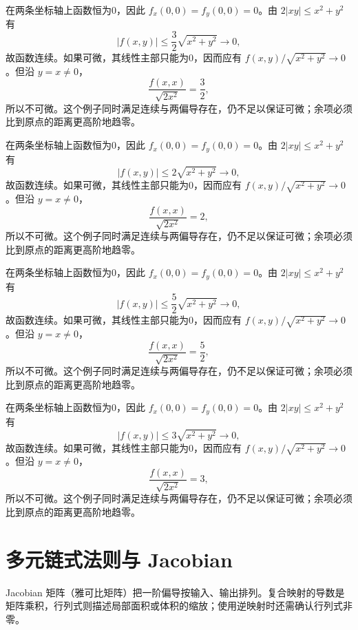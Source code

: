 \documentclass[UTF8,12pt,a4paper,fontset=fandol]{ctexart}
\begin{document}
\begin{solve}\label{ans:c32q22}
在两条坐标轴上函数恒为0，因此 $f_x(0,0)=f_y(0,0)=0$。由 $2|xy|\le x^2+y^2$ 有
\[
|f(x,y)|\le \frac{3}{2}\sqrt{x^2+y^2}\to0,
\]
故函数连续。如果可微，其线性主部只能为0，因而应有 $f(x,y)/\sqrt{x^2+y^2}\to0$。但沿 $y=x\ne0$，
\[
\frac{f(x,x)}{\sqrt{2x^2}}=\frac{3}{2},
\]
所以不可微。这个例子同时满足连续与两偏导存在，仍不足以保证可微；余项必须比到原点的距离更高阶地趋零。
\end{solve}

\begin{solve}\label{ans:c32q23}
在两条坐标轴上函数恒为0，因此 $f_x(0,0)=f_y(0,0)=0$。由 $2|xy|\le x^2+y^2$ 有
\[
|f(x,y)|\le 2\sqrt{x^2+y^2}\to0,
\]
故函数连续。如果可微，其线性主部只能为0，因而应有 $f(x,y)/\sqrt{x^2+y^2}\to0$。但沿 $y=x\ne0$，
\[
\frac{f(x,x)}{\sqrt{2x^2}}=2,
\]
所以不可微。这个例子同时满足连续与两偏导存在，仍不足以保证可微；余项必须比到原点的距离更高阶地趋零。
\end{solve}

\begin{solve}\label{ans:c32q24}
在两条坐标轴上函数恒为0，因此 $f_x(0,0)=f_y(0,0)=0$。由 $2|xy|\le x^2+y^2$ 有
\[
|f(x,y)|\le \frac{5}{2}\sqrt{x^2+y^2}\to0,
\]
故函数连续。如果可微，其线性主部只能为0，因而应有 $f(x,y)/\sqrt{x^2+y^2}\to0$。但沿 $y=x\ne0$，
\[
\frac{f(x,x)}{\sqrt{2x^2}}=\frac{5}{2},
\]
所以不可微。这个例子同时满足连续与两偏导存在，仍不足以保证可微；余项必须比到原点的距离更高阶地趋零。
\end{solve}

\begin{solve}\label{ans:c32q25}
在两条坐标轴上函数恒为0，因此 $f_x(0,0)=f_y(0,0)=0$。由 $2|xy|\le x^2+y^2$ 有
\[
|f(x,y)|\le 3\sqrt{x^2+y^2}\to0,
\]
故函数连续。如果可微，其线性主部只能为0，因而应有 $f(x,y)/\sqrt{x^2+y^2}\to0$。但沿 $y=x\ne0$，
\[
\frac{f(x,x)}{\sqrt{2x^2}}=3,
\]
所以不可微。这个例子同时满足连续与两偏导存在，仍不足以保证可微；余项必须比到原点的距离更高阶地趋零。
\end{solve}

\clearpage
\section{多元链式法则与 Jacobian}\label{sec:ch33}
Jacobian 矩阵（雅可比矩阵）把一阶偏导按输入、输出排列。复合映射的导数是矩阵乘积，行列式则描述局部面积或体积的缩放；使用逆映射时还需确认行列式非零。
\end{document}
